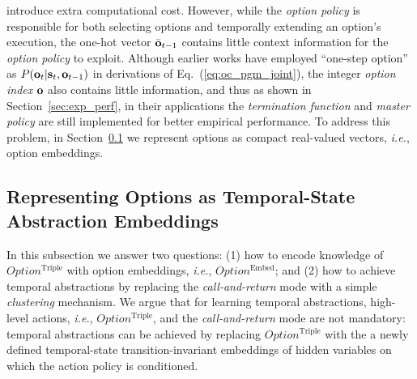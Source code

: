 \documentclass{article}
\begin{document}
  introduce extra computational cost. However, while the
  \emph{option policy} is responsible for both selecting options
  and temporally extending an option's execution, the one-hot vector $\bar{{\mathbf{o}}}_{t-1}$
  contains little context information for the \emph{option
    policy} to exploit. Although earlier works
  \cite{henderson2018optiongan,sharma2018directed,shankar2020learning,lee2020learning,zhang2019dac} have employed ``one-step option'' as $P({\mathbf{o}}_t|{\mathbf{s}}_t,{\mathbf{o}}_{t-1})$ in derivations of Eq.~(\ref{eq:oc_pgm_joint}),
  the integer \emph{option index} ${\mathbf{o}}$ also contains little information, and thus as shown in
  Section~\ref{sec:exp_perf},
  in their applications the \emph{termination function} and
  \emph{master policy} are still implemented for better empirical
  performance. To address this problem, in
Section~\ref{sec:option_embed} we represent options as compact
real-valued vectors, \textit{i.e.}, option embeddings.
 \vspace{-3mm}
\subsection{Representing Options as Temporal-State Abstraction
  Embeddings}
\label{sec:option_embed}
 \vspace{-2mm}
In this subsection we answer two questions: (1) how to encode
knowledge of $Option^{\textrm{Triple}}$ with option embeddings, \textit{i.e.}, $Option^{\textrm{Embed}}$; and (2) how to achieve
temporal abstractions by replacing the \emph{call-and-return} mode
with a simple \emph{clustering} mechanism. We argue that for
learning temporal abstractions, high-level actions, \textit{i.e.},
$Option^{\textrm{Triple}}$, and the \emph{call-and-return} mode are not
mandatory: temporal abstractions can be achieved by replacing
$Option^{\textrm{Triple}}$ with the a newly defined temporal-state transition-invariant embeddings of hidden variables on which the action policy is conditioned.
\end{document}
